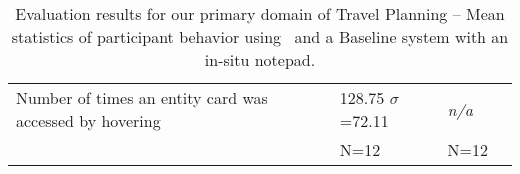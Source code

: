 \begin{table*}
\begin{tabular}{p{}  p{} p{} p{}}
    \hline
    
	Number of times an entity card was accessed by hovering &
    128.75 \newline $\sigma$=72.11 &
    \textit{n/a} &
    \\
	
	\arrayrulecolor{black}\hline
	
	&
    N=12 &
    N=12 &
    \\
	
  \end{tabular}
  \caption{Evaluation results for our primary domain of Travel Planning -- Mean statistics of participant behavior using \SYSTEM~and a Baseline system with an in-situ notepad.}
  \label{tab:results_main}
\end{table*}